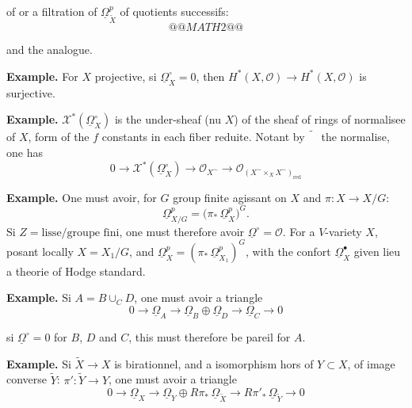 \documentclass[11pt,a4paper]{article}
\theoremstyle{plain}
\theoremstyle{definition}
\begin{document}
of or a filtration of $\underline{\Omega}^{p}_{\widetilde{X}}$ of quotients successifs:
\[
@@MATH2@@
\]

and the analogue.

\vspace{0.5cm}

\noindent\textbf{Example.} For $X$ projective, si $\underline{\Omega}^{\circ}_{X} = 0$, then $H^{*}(X,\mathcal{O}) \to H^{*}(X,\mathcal{O})$ is surjective.

\vspace{0.3cm}

\noindent\textbf{Example.} $\mathcal{X}^{*}(\underline{\Omega}^{\circ}_{X})$ is the under-sheaf (nu $X$) of the sheaf of rings of normalisee of $X$, form of the $f$ constants in each fiber reduite. Notant by $\widetilde{\phantom{X}}$ the normalise, one has
\[
0 \longrightarrow \mathcal{X}^{*}(\underline{\Omega}^{\circ}_{X}) \longrightarrow \mathcal{O}_{X^{\sim}} \longrightarrow \mathcal{O}_{(X^{\sim} \times_{X} X^{\sim})_{\mathrm{red}}}
\]

\vspace{0.3cm}

\noindent\textbf{Example.} One must avoir, for $G$ group finite agissant on $X$ and $\pi : X \to X/G$:
\[
\underline{\Omega}^{p}_{X/G} = \bigl(\pi_{*}\,\underline{\Omega}^{p}_{X}\bigr)^{G}.
\]
Si $Z = \text{lisse}/\text{groupe fini}$, one must therefore avoir $\underline{\Omega}^{\circ} = \mathcal{O}$. For a $V$-variety $X$, posant locally $X = X_{1}/G$, and $\underline{\Omega}^{p}_{X} = (\pi_{*}\,\underline{\Omega}^{p}_{X_{1}})^{G}$, with the confort $\underline{\Omega}^{\bullet}_{X}$ given lieu a theorie of Hodge standard.

\vspace{0.3cm}

\noindent\textbf{Example.} Si $A = B \cup_{C} D$, one must avoir a triangle
\[
0 \longrightarrow \underline{\Omega}_{A} \longrightarrow \underline{\Omega}_{B} \oplus \underline{\Omega}_{D} \longrightarrow \underline{\Omega}_{C} \longrightarrow 0
\]

\newpage

si $\underline{\Omega}^{\circ} = 0$ for $B$, $D$ and $C$, this must therefore be pareil for $A$.

\vspace{0.3cm}

\noindent\textbf{Example.} Si $\widetilde{X} \to X$ is birationnel, and a isomorphism hors of $Y \subset X$, of image converse $\widetilde{Y}$: $\pi' : \widetilde{Y} \to Y$, one must avoir a triangle
\[
0 \longrightarrow \underline{\Omega}_{X} \longrightarrow \underline{\Omega}_{Y} \oplus R\pi_{*}\,\underline{\Omega}_{\widetilde{X}} \longrightarrow R\pi'_{*}\,\underline{\Omega}_{\widetilde{Y}} \longrightarrow 0
\]
\end{document}
